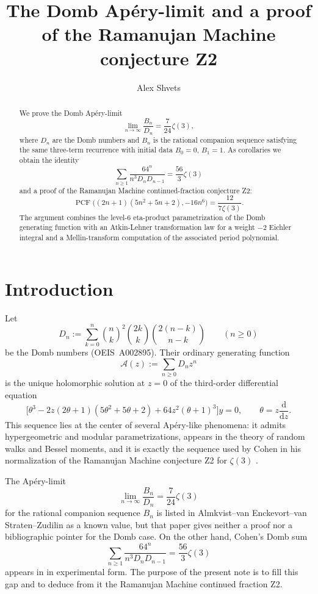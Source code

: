 \documentclass[11pt]{amsart}
\title[The Domb Apéry-limit and RM conjecture Z2]{The Domb Apéry-limit and a proof of the Ramanujan Machine conjecture Z2}
\author{Alex Shvets}
\theoremstyle{definition}
\theoremstyle{remark}
\newcommand{\dd}{\mathrm{d}}
\newcommand{\thet}{\theta}
\DeclareMathOperator{\PCF}{PCF}
\begin{document}
\begin{abstract}
We prove the Domb Apéry-limit
\[
\lim_{n\to\infty}\frac{B_n}{D_n}=\frac{7}{24}\zeta(3),
\]
where $D_n$ are the Domb numbers and $B_n$ is the rational companion sequence satisfying the same three-term recurrence with initial data $B_0=0$, $B_1=1$. As corollaries we obtain the identity
\[
\sum_{n\ge 1}\frac{64^n}{n^3D_nD_{n-1}}=\frac{56}{3}\zeta(3)
\]
and a proof of the Ramanujan Machine continued-fraction conjecture Z2:
\[
\PCF\bigl((2n+1)(5n^2+5n+2),-16n^6\bigr)=\frac{12}{7\zeta(3)}.
\]
The argument combines the level-$6$ eta-product parametrization of the Domb generating function with an Atkin-Lehner transformation law for a weight $-2$ Eichler integral and a Mellin-transform computation of the associated period polynomial.
\end{abstract}

\maketitle

\section{Introduction}

Let
\begin{equation}\label{eq:Domb-def}
D_n:=\sum_{k=0}^n \binom{n}{k}^2\binom{2k}{k}\binom{2(n-k)}{n-k}
\qquad(n\ge 0)
\end{equation}
be the Domb numbers (OEIS~A002895). Their ordinary generating function
\[
\mathcal A(z):=\sum_{n\ge 0}D_nz^n
\]
is the unique holomorphic solution at $z=0$ of the third-order differential equation
\begin{equation}\label{eq:domb-theta-ode}
\bigl[\thet^3-2z(2\thet+1)(5\thet^2+5\thet+2)+64z^2(\thet+1)^3\bigr]y=0,
\qquad \thet=z\frac{\dd}{\dd z}.
\end{equation}
This sequence lies at the center of several Apéry-like phenomena: it admits hypergeometric and modular parametrizations, appears in the theory of random walks and Bessel moments, and it is exactly the sequence used by Cohen in his normalization of the Ramanujan Machine conjecture Z2 for $\zeta(3)$ \cite{BSWZ,Cohen23,Raayoni2021,Yang2008,Zhou1911}.

The Apéry-limit
\begin{equation}\label{eq:main-limit-intro}
\lim_{n\to\infty}\frac{B_n}{D_n}=\frac{7}{24}\zeta(3)
\end{equation}
for the rational companion sequence $B_n$ is listed in Almkvist--van Enckevort--van Straten--Zudilin \cite{AVSZ} as a known value, but that paper gives neither a proof nor a bibliographic pointer for the Domb case. On the other hand, Cohen's Domb sum
\begin{equation}\label{eq:cohen-intro}
\sum_{n\ge 1}\frac{64^n}{n^3D_nD_{n-1}}=\frac{56}{3}\zeta(3)
\end{equation}
appears in \cite{Cohen23} in experimental form. The purpose of the present note is to fill this gap and to deduce from it the Ramanujan Machine continued fraction Z2.
\end{document}
